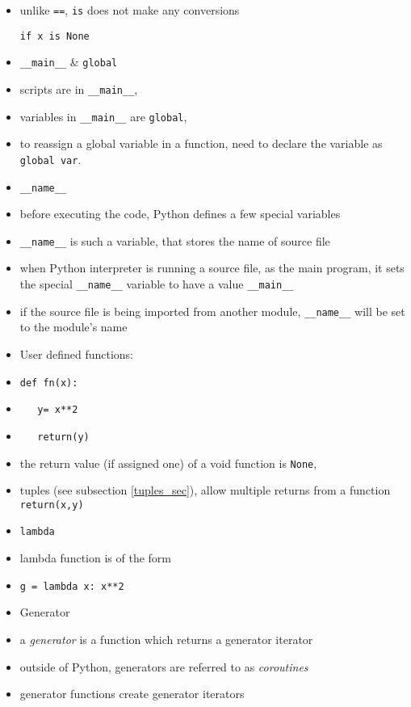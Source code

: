 \documentclass[onecolumn]{IEEEtran} %
\begin{document}
\begin{itemize}
        \item unlike \verb|==|, \verb|is| does not make any conversions
        \begin{verbatim}
if x is None
        \end{verbatim}
    \ei
    \item \verb|__main__| \& \verb|global|
    \bi
        \item scripts are in \verb|__main__|,
        \item variables in \verb|__main__| are \verb|global|,
        \item to reassign a global variable in a function, need to declare the variable as \verb|global var|.
    \ei
    \item \verb|__name__|
    \bi
        \item before executing the code, Python defines a few special variables
        \item \verb|__name__| is such a variable, that stores the name of source file
        \item when Python interpreter is running a source file, as the main program, it sets the special \verb|__name__| variable to have a value \verb|__main__|
        \item if the source file is being imported from another module, \verb|__name__| will be set to the module's name
    \ei
    \item User defined functions:
    \bi
        \item \verb|def fn(x):|
        \item \verb|   y= x**2|
        \item \verb|   return(y)|
        \item the return value (if assigned one) of a void function is \verb|None|,
        \item tuples (see subsection \ref{tuples_sec}), allow multiple returns from a function \newline \verb|return(x,y)|
    \ei
    \item \verb|lambda|
    \bi
        \item lambda function is of the form
        \item \verb|g = lambda x: x**2|
    \ei
    \item Generator
    \bi
        \item a \emph{generator} is a function which returns a generator iterator
        \bi
            \item outside of Python, generators are referred to as \emph{coroutines}
            \item generator functions create generator iterators

\end{itemize}
\end{document}

